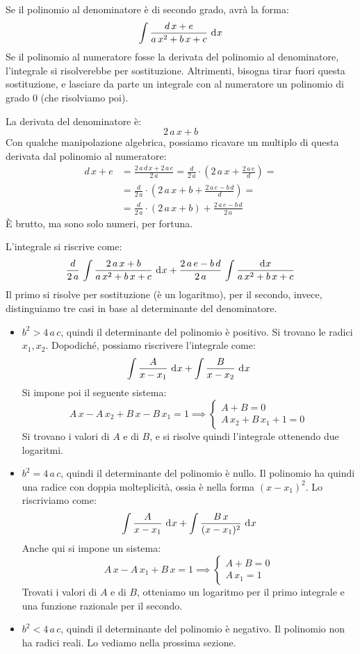 Se il polinomio al denominatore \`e di secondo grado, avr\`a la forma:
\[
\int \frac{d \, x + e}{a \, x^2 + b \, x + c} \dx
\]
Se il polinomio al numeratore fosse la derivata del polinomio al 
denominatore, l'integrale si risolverebbe per sostituzione. Altrimenti, 
bisogna tirar fuori questa sostituzione, e lasciare da parte un integrale 
con al numeratore un polinomio di grado 0 (che risolviamo poi).

La derivata del denominatore \`e:
\[
2 \, a \, x + b
\]
Con qualche manipolazione algebrica, possiamo ricavare un multiplo di 
questa derivata dal polinomio al numeratore:
\begin{align*}
d \, x + e &= \frac{2 \, a \, d \, x + 2 \, a \, e}{2 \, a} =
\frac{d}{2 \, a} \cdot \left( 2 \, a \, x + \frac{2 \, a \, e}{d} \right) = \\
&= \frac{d}{2 \, a} \cdot \left( 2 \, a \, x + b + \frac{2 \, a \, e - b \, d}{d} \right) = \\
&= \frac{d}{2 \, a} \cdot \left( 2 \, a \, x + b \right) + \frac{2 \, a \, e - b \, d}{2 \, a}
\end{align*}
\`E brutto, ma sono solo numeri, per fortuna.

L'integrale si riscrive come:
\[
\frac{d}{2 \, a} \, \int \frac{2 \, a \, x + b}{a \, x^2 + b \, x + c} \dx +
\frac{2 \, a \, e - b \, d}{2 \, a} \, \int \frac{\diff x}{a \, x^2 + b \, x + c}
\]
Il primo si risolve per sostituzione (\`e un logaritmo), per il secondo,
invece, distinguiamo tre casi in base al determinante del denominatore.
\begin{itemize}
    \item $b^2 > 4 \, a \, c$, quindi il determinante del polinomio \`e 
    positivo. Si trovano le radici $x_1, x_2$. Dopodich\'e, possiamo 
    riscrivere l'integrale come:
    \[
    \int \frac{A}{x - x_1} \dx + \int \frac{B}{x - x_2} \dx 
    \]
    Si impone poi il seguente sistema:
    \[
    A \, x - A \, x_2 + B \, x - B \, x_1 = 1 \implies
    \begin{cases}
    A + B = 0 \\
    A \, x_2 + B \, x_1 + 1 = 0
    \end{cases}
    \]
    Si trovano i valori di $A$ e di $B$, e si risolve quindi l'integrale 
    ottenendo due logaritmi.
    \item $b^2 = 4 \, a \, c$, quindi il determinante del polinomio \`e 
    nullo. Il polinomio ha quindi una radice con doppia molteplicit\`a,
    ossia \`e nella forma $(x - x_1)^2$. Lo riscriviamo come:
    \[
    \int \frac{A}{x - x_1} \dx + \int \frac{B \, x}{(x - x_1)^2} \dx
    \]
    Anche qui si impone un sistema:
    \[
    A \, x - A \, x_1 + B \, x = 1 \implies 
    \begin{cases}
    A + B = 0 \\
    A \, x_1 = 1
    \end{cases}
    \]
    Trovati i valori di $A$ e di $B$, otteniamo un logaritmo per il 
    primo integrale e una funzione razionale per il secondo.
    \item $b^2 < 4 \, a \, c$, quindi il determinante del polinomio \`e 
    negativo. Il polinomio non ha radici reali. Lo vediamo nella prossima 
    sezione.
\end{itemize}

